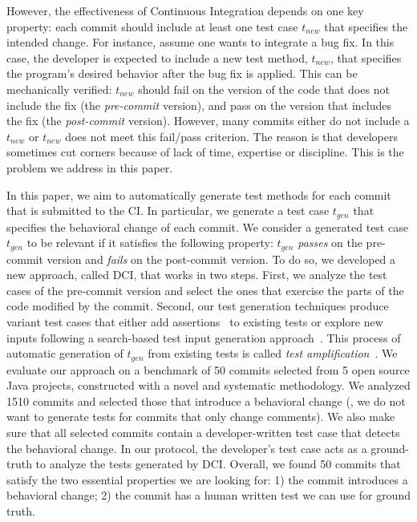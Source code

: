 However, the effectiveness of Continuous Integration depends on one key property: each commit should include at least one test case $t_{new}$ that specifies the intended change.
For instance, assume one wants to integrate a bug fix.
In this case, the developer is expected to include a new test method, $t_{new}$, that specifies the program's desired behavior after the bug fix is applied.
This can be mechanically verified: $t_{new}$ should fail on the version of the code that does not include the fix (the \emph{pre-commit} version), and pass on the version that includes the fix (the \emph{post-commit} version).
However, many commits either do not include a $t_{new}$ or $t_{new}$ does not meet this fail/pass criterion.
The reason is that developers sometimes cut corners because of lack of time, expertise or discipline. This is the problem we address in this paper.

In this paper, we aim to automatically generate test methods for each commit that is submitted to the CI.
In particular, we generate a test case $t_{gen}$ that specifies the behavioral change of each commit.
We consider a generated test case $t_{gen}$ to be relevant if it satisfies the following property: $t_{gen}$ \textit{passes} on the pre-commit version and \textit{fails} on the post-commit version.
To do so, we developed a new approach, called DCI, that works in two steps.
First, we analyze the test cases of the pre-commit version and select the ones that exercise the parts of the code modified by the commit.
Second, our test generation techniques produce variant test cases that either add assertions~\cite{TaoXie2006} to existing tests or explore new inputs following a search-based test input generation approach~\cite{tonella}.
This process of automatic generation of $t_{gen}$ from existing tests is called \emph{test amplification}~\cite{zhang2012}.
We evaluate our approach on a benchmark of 50 commits selected from 5 open source Java projects, constructed with a novel and systematic methodology.
We analyzed 1510 commits and selected those that introduce a behavioral change (\eg, we do not want to generate tests for commits that only change comments).
We also make sure that all selected commits contain a developer-written test case that detects the behavioral change.
In our protocol, the developer's test case acts as a ground-truth to analyze the tests generated by DCI.
Overall, we found 50 commits that satisfy the two essential properties we are looking for:
1) the commit introduces a behavioral change;
2) the commit has a human written test we can use for ground truth.

